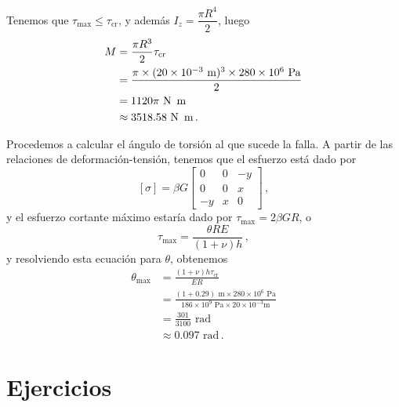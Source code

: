 \documentclass[../notas medios.tex]{subfiles}
\begin{document}
\begin{itemize}
Tenemos que \(\tau_{\max} \leq \tau_\text{cr}\), y además \(I_z = \dfrac{\pi R^4}{2}\), luego
\begin{align*}
M &= \frac{\pi R^3}{2}\tau_\text{cr}\\
  &= \frac{\pi \times (20\times 10^{-3}\text{ m})^3 \times 280 \times 10^6 \text{ Pa}}{2}\\
  &= 1120 \pi \text{ N\, m}\\
  &\approx 3518.58 \text{ N\, m}\, .
\end{align*}

Procedemos a calcular el ángulo de torsión al que sucede la falla. A partir de las relaciones de deformación-tensión, tenemos que el esfuerzo está dado por
\[[\sigma] = \beta G\begin{bmatrix}
	0 &0 &-y\\
	0 &0 & x\\
	-y & x &0
    \end{bmatrix}\, ,
   \]
y el esfuerzo cortante máximo estaría dado por \(\tau_{\max} = 2\beta G R\), o
\[\tau_{\max} = \frac{\theta R E}{(1 + \nu) h}\, ,\]
y resolviendo esta ecuación para \(\theta\), obtenemos
\begin{align*}
\theta_{\max} &= \frac{(1 + \nu) h \tau_\text{cr}}{E R} \\
  &= \frac{(1 + 0.29) \text{ m}\times 280\times 10^6 \text{ Pa}}{186\times 10^{9}\text{ Pa} \times 20\times 10^{-3}\text{m}} \\
  &=\frac{301}{3100}\text{ rad}\\
  &\approx 0.097 \text{ rad}\, .
\end{align*}

\end{itemize}


\section{Ejercicios}
\end{document}
